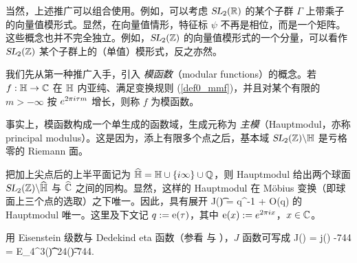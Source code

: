 当然，上述推广可以组合使用。例如，可以考虑 $\operatorname{\textsl{SL}}_2(\mathbb{R})$ 的某个子群 $\Gamma$ 上带乘子的向量值模形式。显然，在向量值情形，特征标 $\psi$ 不再是相位，而是一个矩阵。
这些概念也并不完全独立。例如，$\operatorname{\textsl{SL}}_2(\mathbb{Z})$ 的向量值模形式的一个分量，可以看作 $\operatorname{\textsl{SL}}_2(\mathbb{Z})$ 某个子群上的（单值）模形式，反之亦然。

我们先从第一种推广入手，引入 {\it 模函数}（modular functions）的概念。若 $f:\mathbb{H}\to \mathbb{C}$ 在 $\mathbb{H}$ 内亚纯、满足变换规则 (\ref{def0_mmf})，并且对某个有限的 ${m> -\infty}$ 按 $e^{2\pi i \tau m}$ 增长，则称 $f$ 为模函数。


事实上，模函数构成一个单生成的函数域，生成元称为 {\it 主模}（Hauptmodul，亦称 principal modulus）。这是因为，添上有限多个点之后，基本域 $\operatorname{\textsl{SL}}_2(\mathbb{Z})\backslash \mathbb{H}$ 是亏格零的 Riemann 面。


把加上尖点后的上半平面记为 $\widehat {\mathbb{H}} = \mathbb{H} \cup\{i\infty\} \cup \mathbb{Q}$，则 Hauptmodul 给出两个球面 $\operatorname{\textsl{SL}}_2(\mathbb{Z})\backslash \widehat{\mathbb{H}}$ 与 $\widehat {\mathbb{C}}$ 之间的同构。显然，这样的 Hauptmodul 在 Möbius 变换（即球面上三个点的选取）之下唯一。因此，具有展开
\be
J(\t) = q^{-1} + O(q)
\ee
的 Hauptmodul 唯一。这里及下文记 $q:= \operatorname{e}(\tau)$，其中 $\operatorname{e}(x):=e^{2\pi i x}$，$x\in \mathbb{C}$。


用 Eisenstein 级数与 Dedekind eta 函数（参看  与 ），$J$ 函数可写成
\be\label{eq:def_J}
J(\tau) = j(\tau) -744 =  {E_4^3(\t)\over  \eta^{24}(\t)}-744. 
\ee


